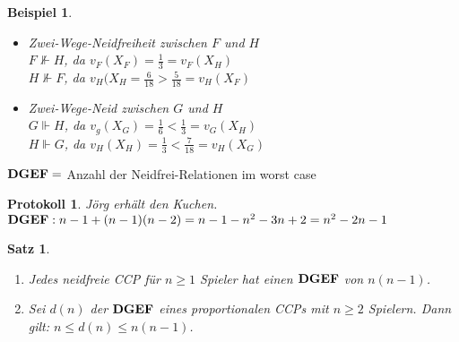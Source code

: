 \documentclass[a4paper,10pt]{scrartcl}
\newtheorem*{beispiel*}{Beispiel}
\newtheorem*{satz*}{Satz}
\newtheorem*{protokoll*}{Protokoll}
\newcommand{\DGEF}{\text{\textbf{DGEF}}}
\begin{document}
\begin{beispiel*}
\begin{itemize}
  \item[] Zwei-Wege-Neidfreiheit zwischen $F$ und $H$\\ $F\nVdash H$, da $v_F(X_F)=\frac{1}{3}=v_F(X_H)$\\
          $H\nVdash F$, da $v_H(X_H=\frac{6}{18}>\frac{5}{18}=v_H(X_F)$
  \item[] Zwei-Wege-Neid zwischen $G$ und $H$\\$G\Vdash H$, da $v_g(X_G)=\frac{1}{6}<\frac{1}{3}=v_G(X_H)$\\
          $H\Vdash G$, da $v_H(X_H)=\frac{1}{3}<\frac{7}{18}=v_H(X_G)$
 \end{itemize}
\end{beispiel*}

$\DGEF =$ Anzahl der Neidfrei-Relationen im worst case
\begin{protokoll*}
 Jörg erhält den Kuchen.\\
 $\DGEF: n-1+(n-1)(n-2)=n-1-n^2-3n+2=n^2-2n-1$
\end{protokoll*}
\begin{satz*}
 \begin{enumerate}
  \item Jedes neidfreie CCP für $n\geq1$ Spieler hat einen $\DGEF$ von $n(n-1)$.
  \item Sei $d(n)$ der $\DGEF$ eines proportionalen CCPs mit $n\geq2$ Spielern. Dann gilt: $n\leq d(n)\leq n(n-1)$.
 \end{enumerate}
\end{satz*}
\end{document}
